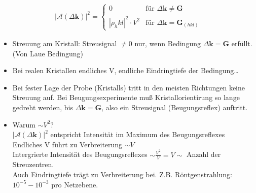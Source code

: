 \begin{align*}
    \left| \mathcal{A} ( \Delta \textbf{k}) \right| ^2 = \begin{cases}
        0 & \text{für } \Delta \textbf{k} \neq \textbf{G}\\
        \left| \rho_hkl\right|^2 \cdot V^2 &  \text{für } \Delta \textbf{k} = \textbf{G}_{(hkl)}
    \end{cases}
\end{align*}
\begin{itemize}
    \item Streuung am Kristall: Streusignal $\neq 0$ nur, wenn Bedingung $\Delta \textbf{k} = \textbf{G}$ erfüllt. (Von Laue Bedingung)
    \item Bei realen Kristallen endliches V, endliche Eindringtiefe der Bedingung\dots
    \item Bei fester Lage der Probe (Kristalls) tritt in den meisten Richtungen keine Streuung auf. Bei Beugungsexperimente muß Kristallorientirung so lange gedreht werden, bis $\Delta \textbf{k} = \textbf{G}$, also ein Streusignal (Beugungsreflex) auftritt.
    \item Warum $\sim V^2$?\\
    $|\mathcal{A}(\Delta \textbf{k})|^2$ entspricht Intensität im Maximum des Beugungsreflexes Endliches V führt zu Verbreiterung $\sim V$\\
    Intergrierte Intensität des Beugungsreflexes $\sim \frac{V^2}{V} = V \sim$ Anzahl der Streuzentren.\\
    Auch Eindringtiefe trägt zu Verbreiterung bei. Z.B. Röntgenstrahlung: $10^{-5}-10^{-3}$ pro Netzebene.
\end{itemize}


